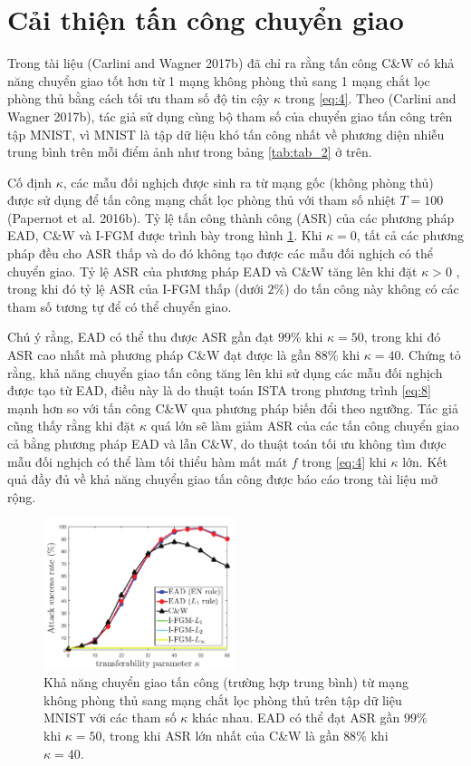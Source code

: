 \section{Cải thiện tấn công chuyển giao}
Trong tài liệu (Carlini and Wagner 2017b) đã chỉ ra rằng tấn công C\&W có khả năng chuyển giao tốt hơn  từ 1 mạng không phòng thủ sang 1 mạng chắt lọc phòng thủ bằng cách tối ưu tham số độ tin cậy $\kappa$ trong \ref{eq:4}. Theo (Carlini and Wagner 2017b), tác giả sử dụng cùng bộ tham số của chuyển giao tấn công trên tập MNIST, vì MNIST là tập dữ liệu khó tấn công nhất về phương diện nhiễu trung bình trên mỗi điểm ảnh như trong bảng \ref{tab:tab_2} ở trên.

Cố định $\kappa$, các mẫu đối nghịch được sinh ra từ mạng gốc (không phòng thủ) được sử dụng để tấn công mạng chắt lọc phòng thủ với tham số nhiệt $T = 100$ (Papernot et al. 2016b). Tỷ lệ tấn công thành công (ASR) của các phương pháp EAD, C\&W và I-FGM được trình bày trong hình \ref{fig:fg_04}. Khi $\kappa = 0$, tất cả các phương pháp đều cho ASR thấp và do đó không tạo được các mẫu đối nghịch có thể chuyển giao. Tỷ lệ ASR của phương pháp EAD và C\&W tăng lên khi đặt $\kappa > 0$ , trong khi đó tỷ lệ ASR của I-FGM thấp (dưới $2\%$) do tấn công này không có các tham số tương tự để có thể chuyển giao.

Chú ý rằng, EAD có thể thu được ASR gần đạt $99\%$ khi $\kappa = 50$, trong khi đó ASR cao nhất mà phương pháp C\&W đạt được là gần $88\%$ khi $\kappa = 40$. Chứng tỏ rằng, khả năng chuyển giao tấn công tăng lên khi sử dụng các mẫu đối nghịch được tạo từ EAD, điều này là do thuật toán ISTA trong phương trình \ref{eq:8} mạnh hơn so với tấn công C\&W qua phương pháp biến đổi theo ngưỡng. Tác giả cũng thấy rằng khi đặt $\kappa$ quá lớn sẽ làm giảm ASR của các tấn công chuyển giao cả bằng phương pháp EAD và lẫn C\&W, do thuật toán tối ưu không tìm được mẫu đối nghịch có thể làm tối thiểu hàm mất mát $f$ trong \ref{eq:4} khi $\kappa$ lớn. Kết quả đầy đủ về khả năng chuyển giao tấn công được báo cáo trong tài liệu mở rộng.

\begin{figure}[H] %
    \centering %
    \includegraphics[width=0.5\textwidth]{assets/fig_04.png} 
    \caption{Khả năng chuyển giao tấn công (trường hợp trung bình) từ mạng không phòng thủ sang mạng chắt lọc phòng thủ  trên tập dữ liệu MNIST với các tham số $\kappa$ khác nhau. EAD có thể đạt ASR gần $99\%$ khi $\kappa = 50$, trong khi ASR lớn nhất của C\&W là gần $88\%$ khi $\kappa=40$.} %
    \label{fig:fg_04}
\end{figure}